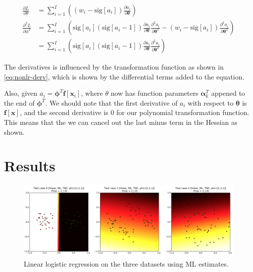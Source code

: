 \documentclass[11pt,openright,a4paper]{article}
\numberwithin{equation}{section}
\begin{document}
\begin{equation} \label{eq:nonlr-derv}
    \begin{aligned}
        \frac{\partial L}{\partial \theta} &= 
            \sum_{i=1}^{I} \left ( \left ( w_i - \text{sig} \left [ a_i  \right ] \right ) 
            \frac{\partial{a_i}}{\partial \boldsymbol\theta} \right )
        \\
        \frac{\partial^2 L}{\partial \phi^2} &=
                \sum_{i=1}^{I} \left ( \text{sig} \left [ a_i  \right ] 
                \left ( \text{sig} \left [ a_i  - 1 \right ] \right ) 
                \frac{\partial a_i}{\partial \boldsymbol{\theta}} 
                \frac{\partial^2 a_i}{\partial \boldsymbol{\theta}^2} -
                \left ( w_i - \text{sig} \left [ a_i \right ] \right ) 
                \frac{\partial^2 a_i}{\partial \boldsymbol{\theta}^2}
                \right )
         \\
        &=
                \sum_{i=1}^{I} \left ( \text{sig} \left [ a_i  \right ] 
                \left ( \text{sig} \left [ a_i  - 1 \right ] \right ) 
                \frac{\partial a_i}{\partial \boldsymbol{\theta}} 
                \frac{\partial^2 a_i}{\partial \boldsymbol{\theta}^2}
                \right )
    \end{aligned}
\end{equation}


The derivatives is influenced by the transformation function as shown in \autoref{eq:nonlr-derv}, which is shown by the differential terms added to the equation.

Also, given $a_i = \boldsymbol{\phi}^{T} \mathbf{f}[ \mathbf{x}_i]$, where $\theta$ now has function parameters $\boldsymbol\alpha_k^T$ appened to the end of $\boldsymbol\phi^T$. We should note that the first derivative of $a_i$ with respect to $\boldsymbol\theta$ is $\mathbf{f}[\mathbf{x}]$, and the second derivative is 0 for our polynomial transformation function. This means that the we can cancel out the last minus term in the Hessian as shown.


\section{Results} \label{sec:results}

\begin{figure}[H]
  \centering
  \includegraphics[width=1\textwidth]{results-lin}
    \caption{Linear logistic regression on the three datasets using ML estimates.}
  \label{fig:results-lin}
\end{figure}
\end{document}
